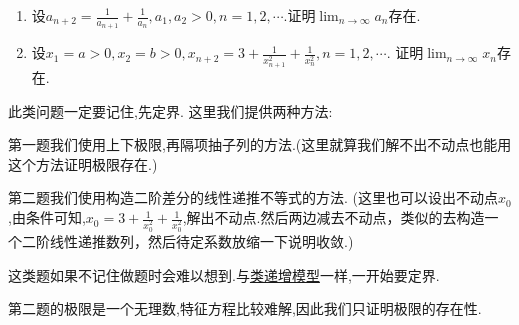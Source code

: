 \documentclass[../../main.tex]{subfiles}%
\begin{document}
\begin{example}[类递减模型]\label{example:类递减模型}
\begin{enumerate}
\item 设\(a_{n + 2} = \frac{1}{a_{n + 1}} + \frac{1}{a_{n}}, a_{1}, a_{2} > 0, n = 1,2,\cdots\).证明\(\lim_{n \to \infty} a_{n}\)存在.

\item 设\(x_{1} = a>0, x_{2} = b>0, x_{n + 2} = 3 + \frac{1}{x_{n + 1}^{2}} + \frac{1}{x_{n}^{2}}, n = 1,2,\cdots\).
证明\(\lim_{n \to \infty} x_{n}\)存在.
\end{enumerate}   
\end{example}
\begin{note}
此类问题一定要记住,先定界.
这里我们提供两种方法:

第一题我们使用上下极限,再隔项抽子列的方法.(这里就算我们解不出不动点也能用这个方法证明极限存在.)

第二题我们使用构造二阶差分的线性递推不等式的方法.
(这里也可以设出不动点$x_0$,由条件可知,$x_0=3+\frac{1}{x_0^2}+\frac{1}{x_0^2}$,解出不动点.然后两边减去不动点，类似的去构造一个二阶线性递推数列，然后待定系数放缩一下说明收敛.)

这类题如果不记住做题时会难以想到.与\hyperref[example:类递增模型]{类递增模型}一样,一开始要定界.
\end{note}
\begin{note}
第二题的极限是一个无理数,特征方程比较难解,因此我们只证明极限的存在性.
\end{note}
\end{document}
